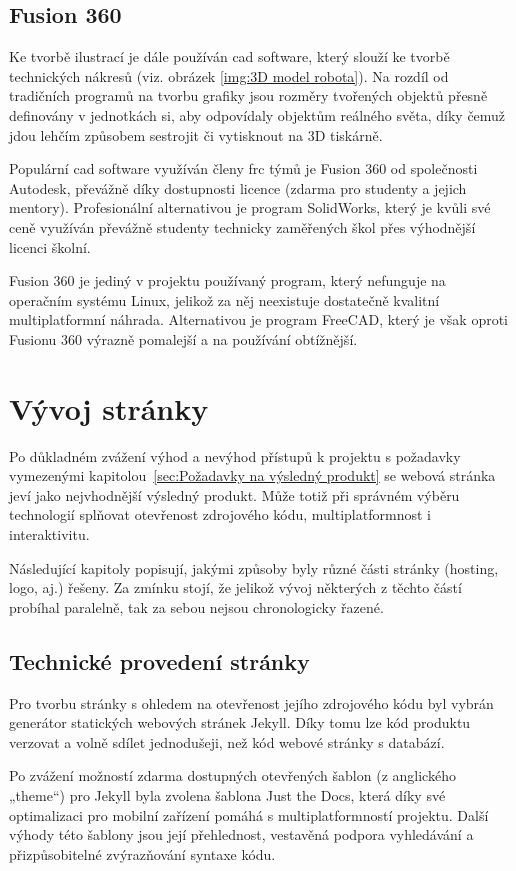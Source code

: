 \documentclass[a4paper, 12pt, twoside]{article}
\begin{document}
  \subsection{Fusion 360} \label{sec:Fusion 360}
  Ke tvorbě ilustrací je dále používán \gls{cad} software, který slouží ke tvorbě technických nákresů (viz. obrázek \ref{img:3D model robota}). Na rozdíl od tradičních programů na tvorbu grafiky jsou rozměry tvořených objektů přesně definovány v jednotkách \gls{si}, aby odpovídaly objektům reálného světa, díky čemuž jdou lehčím způsobem sestrojit či vytisknout na 3D tiskárně.

  Populární \gls{cad} software využíván členy \gls{frc} týmů je Fusion 360 od společnosti Autodesk, převážně díky dostupnosti licence (zdarma pro studenty a jejich mentory). Profesionální alternativou je program SolidWorks, který je kvůli své ceně využíván převážně studenty technicky zaměřených škol přes výhodnější licenci školní.

  Fusion 360 je jediný v projektu používaný program, který nefunguje na operačním systému Linux, jelikož za něj neexistuje dostatečně kvalitní multiplatformní náhrada. Alternativou je program FreeCAD, který je však oproti Fusionu 360 výrazně pomalejší a na používání obtížnější.


  \section{Vývoj stránky}
  Po důkladném zvážení výhod a nevýhod přístupů k projektu s požadavky vymezenými kapitolou~\ref{sec:Požadavky na výsledný produkt} se webová stránka jeví jako nejvhodnější výsledný produkt. Může totiž při správném výběru technologií splňovat otevřenost zdrojového kódu, multiplatformnost i interaktivitu.

  Následující kapitoly popisují, jakými způsoby byly různé části stránky (hosting, logo, aj.) řešeny. Za zmínku stojí, že jelikož vývoj některých z těchto částí probíhal paralelně, tak za sebou nejsou chronologicky řazené.


  \subsection{Technické provedení stránky}
  Pro tvorbu stránky s ohledem na otevřenost jejího zdrojového kódu byl vybrán generátor statických webových stránek Jekyll. Díky tomu lze kód produktu verzovat a volně sdílet jednodušeji, než kód webové stránky s databází.

  Po zvážení možností zdarma dostupných otevřených šablon (z anglického „theme“) pro Jekyll byla zvolena šablona Just the Docs, která díky své optimalizaci pro mobilní zařízení pomáhá s multiplatformností projektu. Další výhody této šablony jsou její přehlednost, vestavěná podpora vyhledávání a přizpůsobitelné zvýrazňování syntaxe kódu.
\end{document}
